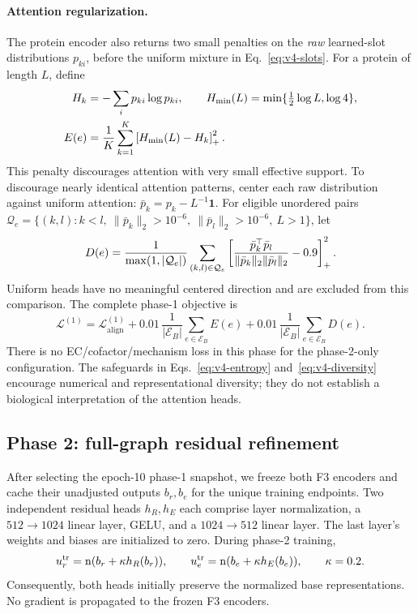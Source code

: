 \paragraph{Attention regularization.}
The protein encoder also returns two small penalties on the \emph{raw}
learned-slot distributions $p_{ki}$, before the uniform mixture in
Eq.~\eqref{eq:v4-slots}. For a protein of length $L$, define
\begin{align}
  H_k&=-\sum_i p_{ki}\log p_{ki},\qquad
  H_{\min}(L)=\min\{\tfrac12\log L,\log4\},\\
  E(e)&=\frac1K\sum_{k=1}^{K}\left[H_{\min}(L)-H_k\right]_{+}^{2}.
  \label{eq:v4-entropy}
\end{align}
This penalty discourages attention with very small effective support. To
discourage nearly identical attention patterns, center each raw distribution
against uniform attention: $\bar p_k=p_k-L^{-1}\mathbf 1$. For eligible
unordered pairs $\mathcal Q_e=\{(k,l):k<l,\ \|\bar p_k\|_2>10^{-6},
\ \|\bar p_l\|_2>10^{-6},\ L>1\}$, let
\begin{equation}
  D(e)=\frac{1}{\max(1,|\mathcal Q_e|)}
     \sum_{(k,l)\in\mathcal Q_e}
       \left[\frac{\bar p_k^\top\bar p_l}
                         {\|\bar p_k\|_2\|\bar p_l\|_2}-0.9\right]_{+}^{2}.
  \label{eq:v4-diversity}
\end{equation}
Uniform heads have no meaningful centered direction and are excluded from
this comparison. The complete phase-1 objective is
\begin{equation}
  \boxed{\mathcal L^{(1)}=
      \mathcal L_{\mathrm{align}}^{(1)}
      +0.01\,\frac{1}{|\mathcal E_B|}\sum_{e\in\mathcal E_B}E(e)
      +0.01\,\frac{1}{|\mathcal E_B|}\sum_{e\in\mathcal E_B}D(e).}
  \label{eq:v4-phase1-total}
\end{equation}
There is no EC/cofactor/mechanism loss in this phase for the phase-2-only
\vfourBio configuration. The safeguards in Eqs.~\eqref{eq:v4-entropy}
and~\eqref{eq:v4-diversity} encourage numerical and representational diversity;
they do not establish a biological interpretation of the attention heads.

\subsection{Phase 2: full-graph residual refinement}
\label{sec:v4-phase2}
After selecting the epoch-10 phase-1 snapshot, we freeze both F3 encoders and
cache their unadjusted outputs $b_r,b_e$ for the unique training endpoints.
Two independent residual heads $h_R,h_E$ each comprise layer normalization,
a $512\!\to\!1024$ linear layer, GELU, and a $1024\!\to\!512$ linear
layer. The last layer's weights and biases are initialized to zero. During
phase-2 training,
\begin{equation}
  u_r^{\mathrm{tr}}=\operatorname{n}(b_r+\kappa h_R(b_r)),\qquad
  u_e^{\mathrm{tr}}=\operatorname{n}(b_e+\kappa h_E(b_e)),\qquad \kappa=0.2.
  \label{eq:v4-residual-training}
\end{equation}
Consequently, both heads initially preserve the normalized base
representations. No gradient is propagated to the frozen F3 encoders.

